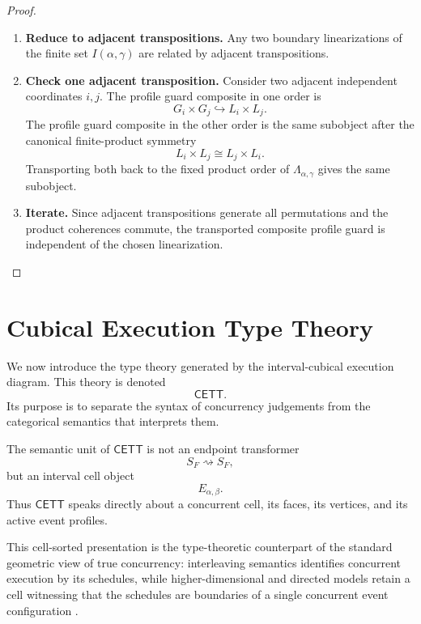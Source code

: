 \begin{proof}
    \leavevmode
    \begin{enumerate}
        \item \textbf{Reduce to adjacent transpositions.}
        Any two boundary linearizations of the finite set
        \(I(\alpha,\gamma)\) are related by adjacent transpositions.

        \item \textbf{Check one adjacent transposition.}
        Consider two adjacent independent coordinates \(i,j\). The profile
        guard composite in one order is
        \[
            G_i\times G_j
            \hookrightarrow
            L_i\times L_j.
        \]
        The profile guard composite in the other order is the same subobject
        after the canonical finite-product symmetry
        \[
            L_i\times L_j\cong L_j\times L_i.
        \]
        Transporting both back to the fixed product order of
        \(\Lambda_{\alpha,\gamma}\) gives the same subobject.

        \item \textbf{Iterate.}
        Since adjacent transpositions generate all permutations and the
        product coherences commute, the transported composite profile guard is
        independent of the chosen linearization.
    \end{enumerate}
\end{proof}

\section{Cubical Execution Type Theory}
\label{sec:cmett-cubical-execution-type-theory}

We now introduce the type theory generated by the interval-cubical execution
diagram. This theory is denoted
\[
    \mathsf{CETT}.
\]
Its purpose is to separate the syntax of concurrency judgements from the
categorical semantics that interprets them.

The semantic unit of \(\mathsf{CETT}\) is not an endpoint transformer
\[
    S_F\rightsquigarrow S_F,
\]
but an interval cell object
\[
    E_{\alpha,\beta}.
\]
Thus \(\mathsf{CETT}\) speaks directly about a concurrent cell, its faces, its
vertices, and its active event profiles.

This cell-sorted presentation is the type-theoretic counterpart of the
standard geometric view of true concurrency: interleaving semantics identifies
concurrent execution by its schedules, while higher-dimensional and directed
models retain a cell witnessing that the schedules are boundaries of a single
concurrent event configuration
\cite{NielsenPlotkinWinskel1981,Pratt1991,Pratt2000,vanGlabbeek2006,FahrenbergJohansenStruthZiemianski2021,Fahrenberg_2024}.

